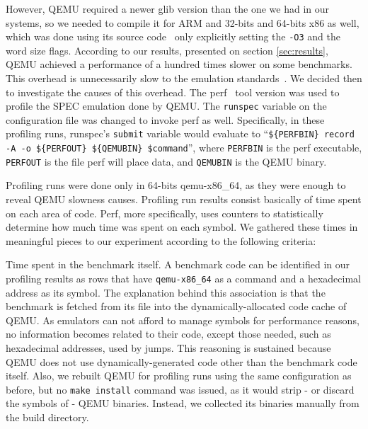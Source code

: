 \documentclass[11pt,twoside]{article}
\begin{document}
  However, QEMU required a newer
  glib version than the one we had in our systems, so we needed
  to compile it for ARM and 32-bits and 64-bits x86 as well,
  which was done using its source code~\cite{glibsrc}
  only explicitly setting the {\tt -O3} and the word size flags.
  According
  to our results, presented on section \ref{sec:results},
  QEMU achieved a performance of a hundred times slower
  on some benchmarks. This overhead is 
  unnecessarily
  slow to the emulation standards~\cite{stardbt}.
  We decided then to investigate the causes of this overhead.
  The perf~\cite{perf} tool version \perfversion \space was used
  to profile the SPEC emulation done by QEMU.
  The {\tt runspec} variable on
  the configuration file was changed to invoke perf as well.
  Specifically, in these profiling runs, %
  runspec's {\tt submit} variable would evaluate to
  ``{\tt \$\{PERFBIN\} record -A -o 
  \$\{PERFOUT\} 
  \$\{QEMUBIN\} \$command}'',
  where {\tt PERFBIN} is the perf
  executable, {\tt PERFOUT} is the file perf will place data,
  and {\tt QEMUBIN} is the QEMU binary.
  
  Profiling runs were done
  only in 64-bits qemu-x86\_64, as they were enough to reveal QEMU
  slowness causes. Profiling run results consist basically of
  time spent on each area of code. Perf, more specifically,
  uses counters to statistically determine how much time was
  spent on each symbol.
  We gathered these times in meaningful pieces to our experiment
  according to the following criteria:

  {\bf \benchmarkname} \space\space
  Time spent in the benchmark itself.
  A benchmark code can be identified in our profiling results
  as rows that have {\tt qemu-x86\_64} as a command and a
  hexadecimal address as its symbol. The explanation behind
  this association is that the benchmark is fetched from its file
  into the dynamically-allocated code cache of QEMU. As emulators
  can not afford to manage symbols for performance reasons,
  no information becomes related to their code, except those
  needed, such as hexadecimal addresses, used by jumps.
  This reasoning is sustained because QEMU does not use
  dynamically-generated code other than the benchmark code itself.
  Also, we rebuilt QEMU for profiling runs using
  the same configuration as before, but no {\tt make install}
  command was issued, as it would strip - or discard the symbols
  of - QEMU binaries. Instead, we collected its binaries manually
  from the build directory.
\end{document}
